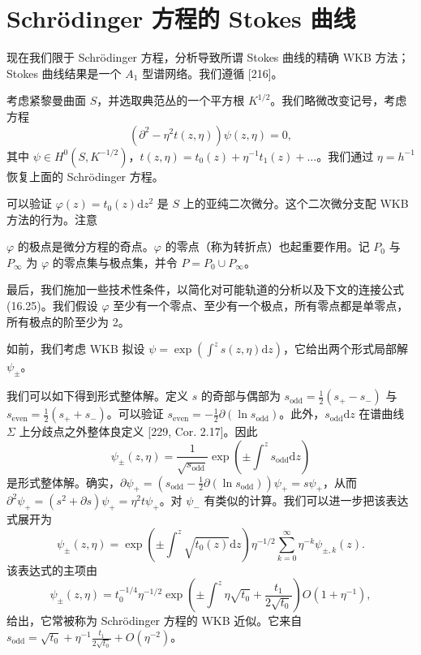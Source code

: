 \section{Schrödinger 方程的 Stokes 曲线}

现在我们限于 Schrödinger 方程，分析导致所谓 Stokes 曲线的精确 WKB 方法；Stokes 曲线结果是一个 $A_1$ 型谱网络。我们遵循 [216]。

考虑紧黎曼曲面 $S$，并选取典范丛的一个平方根 $K^{1/2}$。我们略微改变记号，考虑方程
\begin{equation}
(\partial^2-\eta^2t(z,\eta))\psi(z,\eta)=0,
\tag{16.21}
\end{equation}
其中 $\psi\in H^0(S,K^{-1/2})$，$t(z,\eta)=t_0(z)+\eta^{-1}t_1(z)+\dots$。我们通过 $\eta=h^{-1}$ 恢复上面的 Schrödinger 方程。

可以验证 $\varphi(z)=t_0(z)\mathrm{d}z^2$ 是 $S$ 上的亚纯二次微分。这个二次微分支配 WKB 方法的行为。注意

$\varphi$ 的极点是微分方程的奇点。$\varphi$ 的零点（称为转折点）也起重要作用。记 $P_0$ 与 $P_\infty$ 为 $\varphi$ 的零点集与极点集，并令 $P=P_0\cup P_\infty$。

最后，我们施加一些技术性条件，以简化对可能轨道的分析以及下文的连接公式 (16.25)。我们假设 $\varphi$ 至少有一个零点、至少有一个极点，所有零点都是单零点，所有极点的阶至少为 2。

如前，我们考虑 WKB 拟设 $\psi=\exp\left(\int^z s(z,\eta)\mathrm{d}z\right)$，它给出两个形式局部解 $\psi_\pm$。

我们可以如下得到形式整体解。定义 $s$ 的奇部与偶部为 $s_{\mathrm{odd}}=\frac12(s_+-s_-)$ 与 $s_{\mathrm{even}}=\frac12(s_++s_-)$。可以验证 $s_{\mathrm{even}}=-\frac12\partial(\ln s_{\mathrm{odd}})$。此外，$s_{\mathrm{odd}}\mathrm{d}z$ 在谱曲线 $\Sigma$ 上分歧点之外整体良定义 [229, Cor. 2.17]。因此
\begin{equation}
\psi_\pm(z,\eta)=\frac{1}{\sqrt{s_{\mathrm{odd}}}}\exp\left(\pm\int^z s_{\mathrm{odd}}\mathrm{d}z\right)
\tag{16.22}
\end{equation}
是形式整体解。确实，$\partial\psi_+=(s_{\mathrm{odd}}-\frac12\partial(\ln s_{\mathrm{odd}}))\psi_+=s\psi_+$，从而 $\partial^2\psi_+=(s^2+\partial s)\psi_+=\eta^2t\psi_+$。对 $\psi_-$ 有类似的计算。我们可以进一步把该表达式展开为
\begin{equation}
\psi_\pm(z,\eta)=\exp\left(\pm\int^z\sqrt{t_0(z)}\mathrm{d}z\right)\eta^{-1/2}\sum_{k=0}^\infty\eta^{-k}\psi_{\pm,k}(z).
\tag{16.23}
\end{equation}
该表达式的主项由
\begin{equation}
\psi_\pm(z,\eta)=t_0^{-1/4}\eta^{-1/2}\exp\left(\pm\int^z \eta\sqrt{t_0}+\frac{t_1}{2\sqrt{t_0}}\right)O(1+\eta^{-1}),
\tag{16.24}
\end{equation}
给出，它常被称为 Schrödinger 方程的 WKB 近似。它来自 $s_{\mathrm{odd}}=\sqrt{t_0}+\eta^{-1}\frac{t_1}{2\sqrt{t_0}}+O(\eta^{-2})$。

